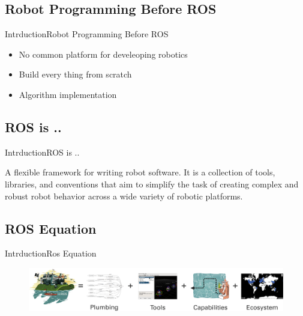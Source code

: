 \documentclass{beamer}
\begin{document}
\subsection{Robot Programming Before ROS}
\begin{frame}{Intrduction}{Robot Programming Before ROS}
\begin{itemize}
  \item
No common platform for develeoping robotics
  \item
Build every thing from scratch 
  \item
  Algorithm implementation 
  \end{itemize}
  
\end{frame}
\subsection{ROS is ..}
\begin{frame}{Intrduction}{ROS is ..}
\begin{block}{}
 A flexible framework for writing robot software. It is a collection of tools, libraries, and conventions that aim to simplify the task of creating complex and robust robot behavior across a wide variety of robotic platforms.
\end{block}

\end{frame}
\subsection{ROS Equation}
\begin{frame}{Intrduction}{Ros Equation}
\begin{figure}
\centering
\includegraphics[scale=1.4]{figs/img/ros_equation}
\end{figure}
\end{frame}
\end{document}
